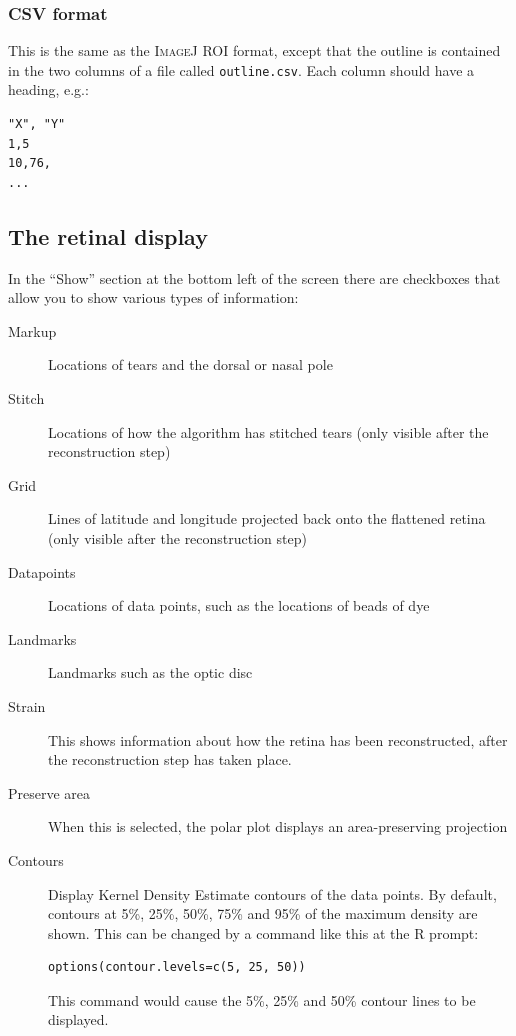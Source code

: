 \documentclass{article}
\begin{document}
\subsubsection{CSV format}
\label{retistruct-manual:sec:csv-format}

This is the same as the \textsc{ImageJ ROI} format, except that the
outline is contained in the two columns of a file called
\texttt{outline.csv}.  Each column should have a heading, e.g.:
\begin{verbatim}
"X", "Y"
1,5
10,76,
...
\end{verbatim}


\subsection{The retinal display}
\label{manual:sec:retinal-display}

In the ``Show'' section at the bottom left of the screen there are
checkboxes that allow you to show various types of information:
\begin{description}
\item[Markup] Locations of tears and the dorsal or nasal pole
\item[Stitch] Locations of how the algorithm has stitched tears (only
  visible after the reconstruction step)
\item[Grid] Lines of latitude and longitude projected back onto the
  flattened retina (only visible after the reconstruction step)
\item[Datapoints] Locations of data points, such as the locations of
  beads of dye
\item[Landmarks] Landmarks such as the optic disc
\item[Strain] This shows information about how the retina has been
  reconstructed, after the reconstruction step has taken place.
\item[Preserve area] When this is selected, the polar plot displays an
  area-preserving projection
\item[Contours] Display Kernel Density Estimate contours of the data
  points. By default, contours at 5\%, 25\%, 50\%, 75\% and 95\% of the maximum
  density are shown. This can be changed by a command like this at the
  R prompt:
\begin{verbatim}
options(contour.levels=c(5, 25, 50))
\end{verbatim}
  This command would cause the 5\%, 25\% and 50\% contour lines to be
  displayed.
\end{description}
\end{document}
